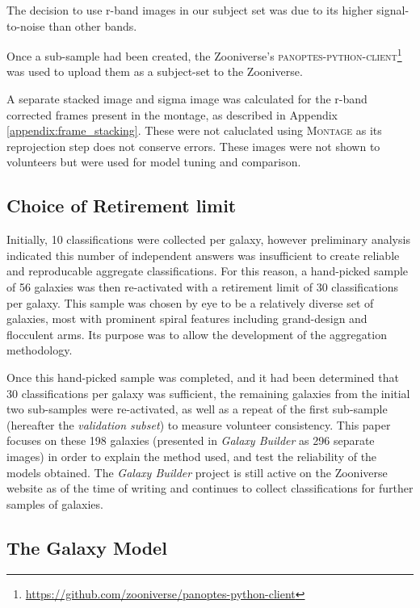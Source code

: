 \documentclass[../main.tex]{subfiles}
\begin{document}
The decision to use r-band images in our subject set was due to its higher signal-to-noise than other bands.

Once a sub-sample had been created, the Zooniverse's \textsc{panoptes-python-client}\footnote{\url{https://github.com/zooniverse/panoptes-python-client}} was used to upload them as a subject-set to the Zooniverse.

A separate stacked image and sigma image was calculated for the r-band corrected frames present in the montage, as described in Appendix \ref{appendix:frame_stacking}. These were not caluclated using \textsc{Montage} as its reprojection step does not conserve errors. These images were not shown to volunteers but were used for model tuning and comparison.


\subsection{Choice of Retirement limit}
\label{sec:retirement-limit}

Initially, 10 classifications were collected per galaxy, however preliminary analysis indicated this number of independent answers was insufficient to create reliable and reproducable aggregate classifications. For this reason, a hand-picked sample of 56 galaxies was then re-activated with a retirement limit of 30 classifications per galaxy. This sample was chosen by eye to be a relatively diverse set of galaxies, most with prominent spiral features including grand-design and flocculent arms. Its purpose was to allow the development of the aggregation methodology.

Once this hand-picked sample was completed, and it had been determined that 30 classifications per galaxy was sufficient, the remaining galaxies from the initial two sub-samples were re-activated, as well as a repeat of the first sub-sample (hereafter the \textit{validation subset}) to measure volunteer consistency. This paper focuses on these 198 galaxies (presented in \textit{Galaxy Builder} as 296 separate images) in order to explain the method used, and test the reliability of the models obtained. The \textit{Galaxy Builder} project is still active on the Zooniverse website as of the time of writing and continues to collect classifications for further samples of galaxies.


\subsection{The Galaxy Model}
\label{section:galaxy-model}
\end{document}
